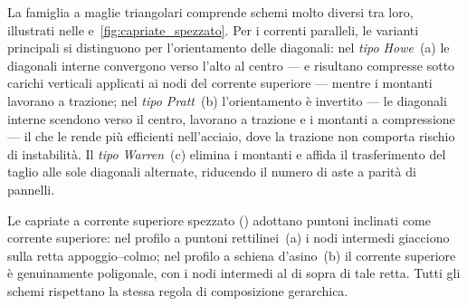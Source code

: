 La famiglia a maglie triangolari comprende schemi
molto diversi tra loro, illustrati nelle
e~\ref{fig:capriate_spezzato}.
Per i correnti paralleli, le varianti principali si
distinguono per l'orientamento delle diagonali: nel
\emph{tipo Howe}~(a)
le diagonali interne convergono verso l'alto al centro
--- e risultano compresse sotto carichi verticali
applicati ai nodi del corrente superiore --- mentre
i montanti lavorano a trazione;
nel \emph{tipo Pratt}~(b)
l'orientamento è invertito --- le diagonali interne
scendono verso il centro, lavorano a trazione e i
montanti a compressione --- il che le rende più
efficienti nell'acciaio, dove la trazione non comporta
rischio di instabilità.
Il \emph{tipo Warren}~(c)
elimina i montanti e affida il trasferimento del taglio
alle sole diagonali alternate, riducendo il numero di
aste a parità di pannelli.

Le capriate a corrente superiore spezzato
() adottano puntoni
inclinati come corrente superiore: nel profilo a
puntoni rettilinei~(a) i nodi intermedi giacciono
sulla retta appoggio--colmo; nel profilo a schiena
d'asino~(b) il corrente superiore è genuinamente
poligonale, con i nodi intermedi al di sopra di
tale retta.
Tutti gli schemi rispettano la stessa regola di
composizione gerarchica.



